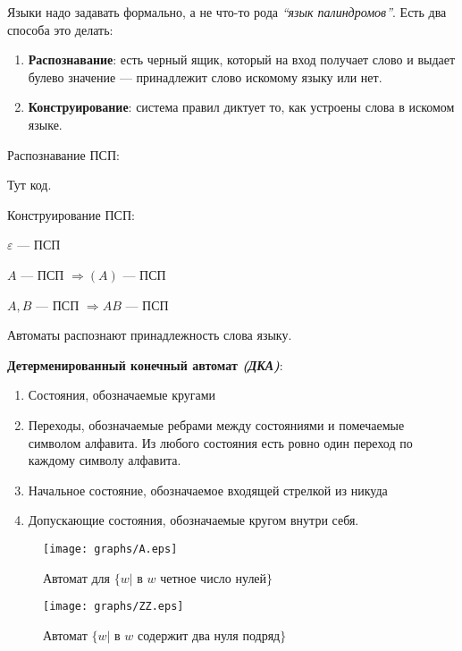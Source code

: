 Языки надо задавать формально, а не что-то рода \textit{``язык палиндромов''}. Есть два способа это делать:
\begin{enumerate}
    \item \textbf{Распознавание}: есть черный ящик, который на вход получает слово и выдает булево значение --- принадлежит слово искомому языку или нет.
    \item \textbf{Конструирование}: система правил диктует то, как устроены слова в искомом языке.
\end{enumerate}

\begin{example}
    Распознавание ПСП:

    Тут код.
\end{example}

\begin{example}
    Конструирование ПСП:

    $\varepsilon$ --- ПСП
    
    $A$ --- ПСП $\Rightarrow (A)$ --- ПСП

    $A, B$ --- ПСП $\Rightarrow AB$ --- ПСП
\end{example}

Автоматы распознают принадлежность слова языку.
\begin{definition}
    \textbf{Детерменированный конечный автомат \textit{(ДКА)}}:
    \begin{enumerate}
        \item Состояния, обозначаемые кругами
        \item Переходы, обозначаемые ребрами между состояниями и помечаемые символом алфавита. Из любого состояния есть ровно один переход по каждому символу алфавита.
        \item Начальное состояние, обозначаемое входящей стрелкой из никуда
        \item Допускающие состояния, обозначаемые кругом внутри себя.
    \end{enumerate}
\end{definition}

\begin{figure}
    \centering
    \begin{minipage}{.5\textwidth}
      \centering
      \texttt{[image: graphs/A.eps]}
      \caption{Автомат для $\{w | \text{ в } w \text{ четное число нулей}\}$}
    \end{minipage}%
    \begin{minipage}{.5\textwidth}
      \centering
      \texttt{[image: graphs/ZZ.eps]}
      \caption{Автомат $\{w | \text{ в } w \text{ содержит два нуля подряд}\}$}
    \end{minipage}
\end{figure}

